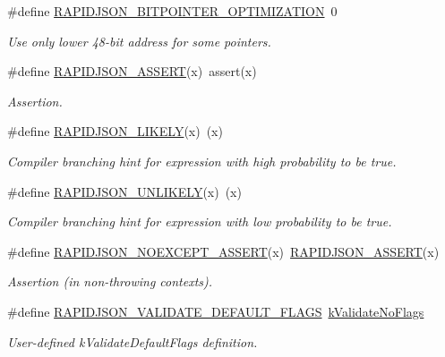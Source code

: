 \begin{DoxyCompactItemize}
\#define \hyperlink{group__RAPIDJSON__CONFIG_ga93fb983f78208d12c822376e1ea6d185}{R\+A\+P\+I\+D\+J\+S\+O\+N\+\_\+B\+I\+T\+P\+O\+I\+N\+T\+E\+R\+\_\+\+O\+P\+T\+I\+M\+I\+Z\+A\+T\+I\+ON}~0
\begin{DoxyCompactList}\small\item\em Use only lower 48-\/bit address for some pointers. \end{DoxyCompactList}\item 
\#define \hyperlink{group__RAPIDJSON__CONFIG_gabeba18d612187bad2ac62aed9276d47c}{R\+A\+P\+I\+D\+J\+S\+O\+N\+\_\+\+A\+S\+S\+E\+RT}(x)~assert(x)
\begin{DoxyCompactList}\small\item\em Assertion. \end{DoxyCompactList}\item 
\#define \hyperlink{group__RAPIDJSON__CONFIG_ga5dc14176a9e71ace282404b0bcda57a1}{R\+A\+P\+I\+D\+J\+S\+O\+N\+\_\+\+L\+I\+K\+E\+LY}(x)~(x)
\begin{DoxyCompactList}\small\item\em Compiler branching hint for expression with high probability to be true. \end{DoxyCompactList}\item 
\#define \hyperlink{group__RAPIDJSON__CONFIG_ga6a2b1695c13e77ae425e3cbac980ccb5}{R\+A\+P\+I\+D\+J\+S\+O\+N\+\_\+\+U\+N\+L\+I\+K\+E\+LY}(x)~(x)
\begin{DoxyCompactList}\small\item\em Compiler branching hint for expression with low probability to be true. \end{DoxyCompactList}\item 
\#define \hyperlink{group__RAPIDJSON__CONFIG_ga2b2a0d9143aa4fb31205a85b34c43952}{R\+A\+P\+I\+D\+J\+S\+O\+N\+\_\+\+N\+O\+E\+X\+C\+E\+P\+T\+\_\+\+A\+S\+S\+E\+RT}(x)~\hyperlink{group__RAPIDJSON__CONFIG_gabeba18d612187bad2ac62aed9276d47c}{R\+A\+P\+I\+D\+J\+S\+O\+N\+\_\+\+A\+S\+S\+E\+RT}(x)
\begin{DoxyCompactList}\small\item\em Assertion (in non-\/throwing contexts). \end{DoxyCompactList}\item 
\#define \hyperlink{group__RAPIDJSON__CONFIG_ga8d06f2d50592811d2890b45243b8adcc}{R\+A\+P\+I\+D\+J\+S\+O\+N\+\_\+\+V\+A\+L\+I\+D\+A\+T\+E\+\_\+\+D\+E\+F\+A\+U\+L\+T\+\_\+\+F\+L\+A\+GS}~\hyperlink{schema_8h_a380a56f9b589025b27a565de4c4a2942a6479c4dbb9ae91ad95b4e6876a96cfa4}{k\+Validate\+No\+Flags}
\begin{DoxyCompactList}\small\item\em User-\/defined k\+Validate\+Default\+Flags definition. \end{DoxyCompactList}\end{DoxyCompactItemize}


